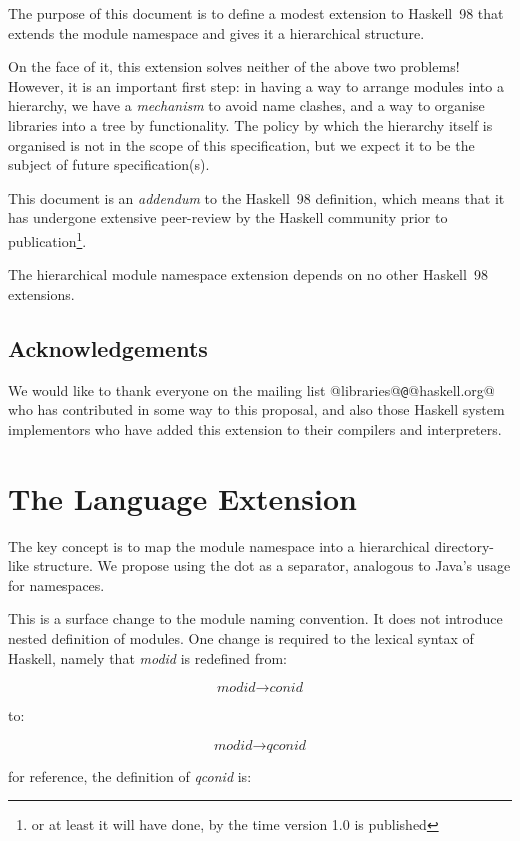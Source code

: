 \documentclass[a4paper,twoside]{article}
\newcommand{\clearemptydoublepage}{%
  \newpage{\pagestyle{empty}\cleardoublepage}}
\begin{document}
The purpose of this document is to define a modest extension to
Haskell~98 that extends the module namespace and gives it a
hierarchical structure.  

On the face of it, this extension solves neither of the above two
problems!  However, it is an important first step: in having a way to
arrange modules into a hierarchy, we have a \emph{mechanism} to avoid
name clashes, and a way to organise libraries into a tree by
functionality.  The policy by which the hierarchy itself is organised
is not in the scope of this specification, but we expect it to be the
subject of future specification(s).

This document is an \emph{addendum} to the Haskell~98 definition,
which means that it has undergone extensive peer-review by the Haskell
community prior to publication\footnote{or at least it will have done,
by the time version 1.0 is published}.

The hierarchical module namespace extension depends on no other
Haskell~98 extensions.

\subsection*{Acknowledgements}

We would like to thank everyone on the mailing list
@libraries@\verb+@+@haskell.org@ who has contributed in some way to this
proposal, and also those Haskell system implementors who have added
this extension to their compilers and interpreters.

\clearemptydoublepage
{}
\section{The Language Extension}

The key concept is to map the module namespace into a hierarchical
directory-like structure. We propose using the dot as a separator,
analogous to Java's usage for namespaces.

This is a surface change to the module naming convention. It does not
introduce nested definition of modules.  One change is required to the
lexical syntax of Haskell, namely that \textit{modid} is redefined
from:

\[
  \textit{modid} \rightarrow \textit{conid}
\]

\noindent to:

\[
  \textit{modid} \rightarrow \textit{qconid}
\]

\noindent for reference, the definition of \textit{qconid} is:
\end{document}
